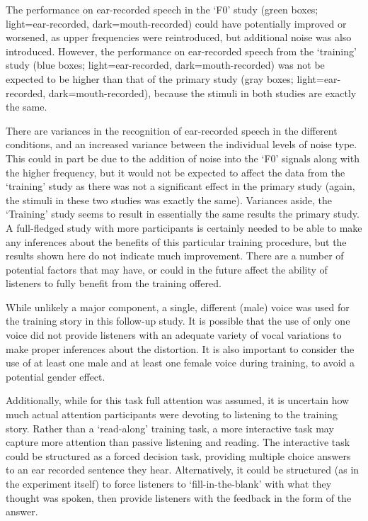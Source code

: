 The performance on ear-recorded speech in the `F0' study (green boxes; light=ear-recorded, dark=mouth-recorded) could have potentially improved or worsened, as upper frequencies were reintroduced, but additional noise was also introduced.  However, the performance on ear-recorded speech from the `training' study (blue boxes; light=ear-recorded, dark=mouth-recorded) was not be expected to be higher than that of the primary study (gray boxes; light=ear-recorded, dark=mouth-recorded), because the stimuli in both studies are exactly the same.  

There are variances in the recognition of ear-recorded speech in the different conditions, and an increased variance between the individual levels of noise type.  This could in part be due to the addition of noise into the `F0' signals along with the higher frequency, but it would not be expected to affect the data from the `training' study as there was not a significant effect in the primary study (again, the stimuli in these two studies was exactly the same).  Variances aside, the `Training' study seems to result in essentially the same results the primary study.  A full-fledged study with more participants is certainly needed to be able to make any inferences about the benefits of this particular training procedure, but the results shown here do not indicate much improvement.  There are a number of potential factors that may have, or could in the future affect the ability of listeners to fully benefit from the training offered.  

While unlikely a major component, a single, different (male) voice was used for the training story in this follow-up study.  It is possible that the use of only one voice did not provide listeners with an adequate variety of vocal variations to make proper inferences about the distortion.  It is also important to consider the use of at least one male and at least one female voice during training, to avoid a potential gender effect.

Additionally, while for this task full attention was assumed, it is uncertain how much actual attention participants were devoting to listening to the training story.  Rather than a `read-along' training task, a more interactive task may capture more attention than passive listening and reading.  The interactive task could be structured as a forced decision task, providing multiple choice answers to an ear recorded sentence they hear.  Alternatively, it could be structured (as in the experiment itself) to force listeners to `fill-in-the-blank' with what they thought was spoken, then provide listeners with the feedback in the form of the answer.  

